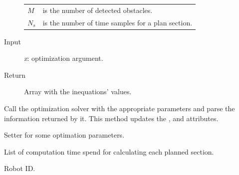 \documentclass[letterpaper,10pt,english]{sphinxmanual}
\begin{document}
\begin{fulllineitems}
\begin{fulllineitems}
\begin{description}
\begin{tabulary}{\linewidth}{|L|L|}
\(M\)
 & 
is the number of detected obstacles.
\\

\(N_s\)
 & 
is the number of time samples for a plan section.
\\
\hline\end{tabulary}


\item[{Input}] \leavevmode
\emph{x}: optimization argument.

\item[{Return}] \leavevmode
Array with the inequations' values.

\end{description}

\end{fulllineitems}


\begin{fulllineitems}
\label{Multi-robot motion planner:planning_sim.Robot._solve_opt_pbl}
Call the optimization solver with the appropriate parameters and parse
the information returned by it. This method updates the , 
and  attributes.

\end{fulllineitems}


\begin{fulllineitems}
\label{Multi-robot motion planner:planning_sim.Robot.set_option}
Setter for some optimation parameters.

\end{fulllineitems}


\begin{fulllineitems}
\label{Multi-robot motion planner:planning_sim.Robot.ctime}
List of computation time spend for calculating each planned section.

\end{fulllineitems}


\begin{fulllineitems}
\label{Multi-robot motion planner:planning_sim.Robot.eyed}
Robot ID.


\end{fulllineitems}
\end{fulllineitems}
\end{document}
